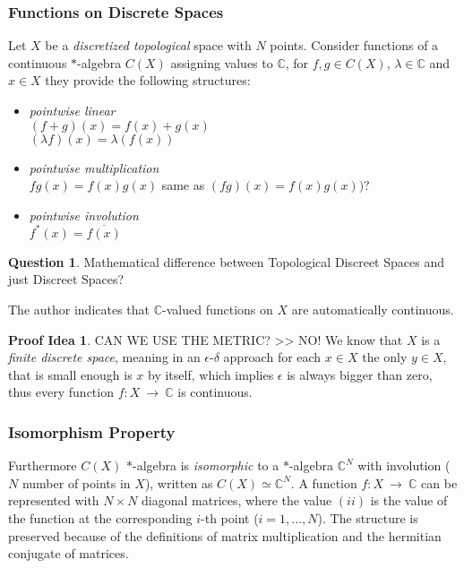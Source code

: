 \documentclass[a4paper]{article}
\theoremstyle{definition}
\theoremstyle{definition}
\newtheorem{question}{Question}
\theoremstyle{theorem}
\theoremstyle{theorem}
\theoremstyle{definition}
\newtheorem*{idea}{Proof Idea}
\begin{document}
\subsubsection{Functions on Discrete Spaces}
Let $X$ be a \textit{discretized topological} space with $N$ points.
Consider functions of a continuous $*$-algebra $C(X)$ assigning values to $\mathbb{C}$, for $f, g \in C(X)$,
$\lambda \in \mathbb{C}$ and $x \in X$ they provide the following structures:

\begin{itemize}
    \item \textit{pointwise linear} \\
      $(f + g)(x) = f(x) + g(x)$\\
      $(\lambda f)(x) = \lambda (f(x))$
    \item \textit{pointwise multiplication} \\
        $fg(x) = f(x)g(x)$ \hspace{0.1\textwidth} same as $(fg)(x) = f(x)g(x))$?
    \item \textit{pointwise involution} \\
        $f^*(x) = \overline{f(x)}$
\end{itemize}

\begin{question}
    Mathematical difference between Topological Discreet Spaces and just Discreet Spaces?
\end{question}

The author indicates that $\mathbb{C}$-valued functions on $X$ are automatically continuous.
\begin{idea}
    CAN WE USE THE METRIC? >> NO!
    We know that $X$ is a \textit{finite discrete space}, meaning in an $\epsilon$-$\delta$ approach
    for each $x \in X$ the only $y \in X$, that is small enough is $x$ by itself, which implies
    $\epsilon$ is always bigger than zero, thus every function $f:X\ \rightarrow\ \mathbb{C}$ is continuous.
\end{idea}

\subsubsection{Isomorphism Property}
Furthermore $C(X)$ $*$-algebra is \textit{isomorphic} to a $*$-algebra $\mathbb{C}^N$ with involution
($N$ number of points in $X$), written as $C(X) \simeq \mathbb{C}^N$.
A function $f:X\ \rightarrow\ \mathbb{C}$ can be represented with $N \times N$ diagonal matrices,
where the value $(ii)$ is the value of the function at the corresponding
$i$-th point ($i = 1,...,N$). The structure is preserved because of the definitions of
matrix multiplication and the hermitian conjugate of matrices.
\end{document}
